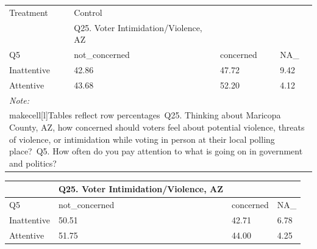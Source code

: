 \documentclass[
  11pt,
  a4paper,
]{article}
\begin{document}
\begin{table}
\centering
\centering
\begin{tabular}[t]{l|l|l|l}
\hline
\multicolumn{1}{l|}{Treatment} & \multicolumn{1}{l}{Control} \\
\cline{1-1} \cline{2-2}
 & Q25. Voter Intimidation/Violence, AZ &  & \\
\hline
Q5 & not\_concerned & concerned & NA\_\\
\hline
Inattentive & 42.86 & 47.72 & 9.42\\
\hline
Attentive & 43.68 & 52.20 & 4.12\\
\hline
\multicolumn{4}{l}{\rule{0pt}{1em}\textit{Note: }}\\
\multicolumn{4}{l}{\rule{0pt}{1em}makecell[l]{Tables reflect row percentages\ Q25. Thinking about Maricopa County, AZ, how concerned should voters feel about potential violence, threats of violence, or intimidation while voting in person at their local polling place?\ Q5. How often do you pay attention to what is going on in government and politics?}}\\
\end{tabular}
\centering
\begin{tabular}[t]{l|l|l|l}
\hline
 & Q25. Voter Intimidation/Violence, AZ &  & \\
\hline
Q5 & not\_concerned & concerned & NA\_\\
\hline
Inattentive & 50.51 & 42.71 & 6.78\\
\hline
Attentive & 51.75 & 44.00 & 4.25\\
\hline
\end{tabular}
\end{table}
\end{document}
